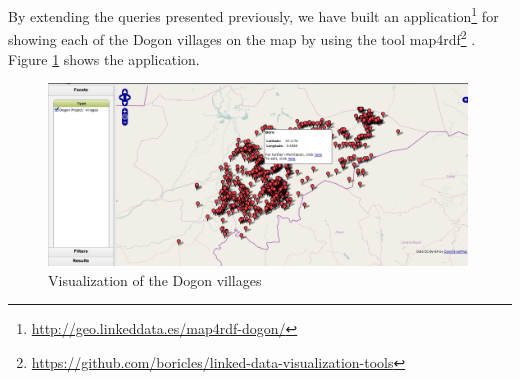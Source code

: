 By extending the queries presented previously, we have built an application\footnote{\url{http://geo.linkeddata.es/map4rdf-dogon/}} for showing each of the Dogon villages on the map by using the tool map4rdf\footnote{\url{https://github.com/boricles/linked-data-visualization-tools}} \cite{deLeon_2012}. Figure \ref{fig:map4rdf} shows the application.

\begin{figure}[htb!p]
\centering
\includegraphics[width=0.99\textwidth]{img/map4rdf.png}
\caption{Visualization of the Dogon villages}
\label{fig:map4rdf}
\end{figure}



